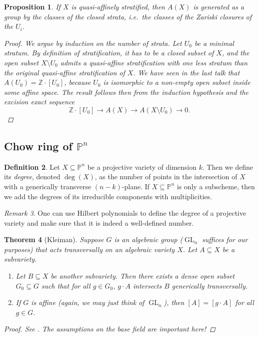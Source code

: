 \documentclass[12pt,a4paper]{amsart}
\theoremstyle{plain}
\newtheorem{thm}{Theorem}
\newtheorem{prop}[thm]{Proposition}
\theoremstyle{definition}
\newtheorem{defn}[thm]{Definition}
\theoremstyle{remark}
\newtheorem{rem}[thm]{Remark}
\begin{document}
\begin{prop}
    If $X$ is quasi-affinely stratified, then $A(X)$ is generated as a group by the classes of the closed strata, i.e.~the classes of the Zariski closures of the $U_{i}$.
    \begin{proof}
	We argue by induction on the number of strata.
	Let $U_{0}$ be a minimal stratum.
	By definition of stratification, it has to be a closed subset of $X$, and the open subset $X\setminus U_{0}$ admits a quasi-affine stratification with one less stratum than the original quasi-affine stratification of $X$.
	We have seen in the last talk that $A(U_{0})=\mathbb{Z}\cdot [U_{0}]$, because $U_{0}$ is isomorphic to a non-empty open subset inside some affine space.
	The result follows then from the induction hypothesis and the excision exact sequence
	\[ \mathbb{Z}\cdot [U_{0}]\to A(X)\to A(X\setminus U_{0})\to 0. \]
    \end{proof}
\end{prop}

\subsection{Chow ring of $\mathbb{P}^{n}$}

\begin{defn}
    Let $X\subseteq \mathbb{P}^{n}$ be a projective variety of dimension $k$.
    Then we define its \textit{degree}, denoted $\deg(X)$, as the number of points in the intersection of $X$ with a generically transverse $(n-k)$-plane.
    If $X\subseteq \mathbb{P}^{n}$ is only a subscheme, then we add the degrees of its irreducible components with multiplicities.
\end{defn}

\begin{rem}
    One can use Hilbert polynomials to define the degree of a projective variety and make sure that it is indeed a well-defined number.
\end{rem}

\begin{thm}[Kleiman]
    Suppose $G$ is an algebraic group ($\operatorname{GL}_{n}$ suffices for our purposes) that acts transversally on an algebraic variety $X$.
    Let $A\subseteq X$ be a subvariety.
    \begin{enumerate}
	\item Let $B\subseteq X$ be another subvariety.
	    Then there exists a dense open subset $G_{0}\subseteq G$ such that for all $g\in G_{0}$, $g\cdot A$ intersects $B$ generically transversally.
	\item If $G$ is affine (again, we may just think of $\operatorname{GL}_{n}$), then $[A]=[g\cdot A]$ for all $g\in G$.
    \end{enumerate}
    \begin{proof}
	See \cite[Theorem 1.7]{eh16}.
	The assumptions on the base field are important here!
    \end{proof}
\end{thm}
\end{document}
